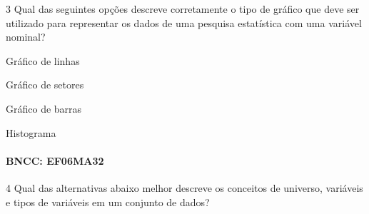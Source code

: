 
\num{3}  Qual das seguintes opções descreve corretamente o tipo de gráfico que
deve ser utilizado para representar os dados de uma pesquisa estatística
com uma variável nominal?

\begin{escolha}
\item Gráfico de linhas
\item Gráfico de setores
\item Gráfico de barras
\item Histograma
\end{escolha}

\paragraph{BNCC: EF06MA32}



\num{4}  Qual das alternativas abaixo melhor descreve os conceitos de
universo, variáveis e tipos de variáveis em um conjunto de dados?

